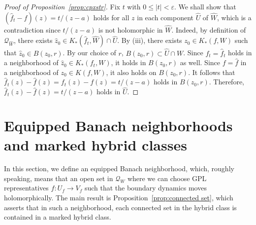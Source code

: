 \documentclass{amsart}
\numberwithin{equation}{section}
\theoremstyle{definition}
\theoremstyle{remark}
\begin{document}
\begin{proof} [Proof of Proposition~\ref{prop:cpxstr}]
Fix $t$ with $0\le |t|<\varepsilon.$ We shall show that $(\widehat{f}_t-\widehat{f})(z)=t/(z-a)$ holds for all $z$ in each component $\widehat{U}$ of $\widehat{W}$, which is a contradiction since $t/(z-a)$ is not holomorphic in $\widehat{W}$.  
Indeed, by definition of $\mathcal{Q}_{\widehat{W}}$, there exists $\widehat{z}_0\in K_*(\widehat{f}_t,\widehat{W})\cap \widehat{U}$. By (iii), there exists $z_0\in K_*(f,W)$ such that $\widehat{z}_0\in B(z_0,r)$. 
By our choice of $r$, $B(z_0,r)\subset \widehat{U}\cap W$. 
Since $f_t=\widehat{f}_t$ holds in a neighborhood of $\widehat{z}_0\in K_*(f_t,W)$, it holds in $B(z_0,r)$ as well. Since $f=\widehat{f}$ in a neighborhood of $z_0\in K(f,W)$, it also holds on $B(z_0,r)$. It follows that $\widehat{f}_t(z)-\widehat{f}(z)=f_t(z)-f(z)=t/(z-a)$ holds in $B(z_0,r)$. Therefore, 
$\widehat{f}_t(z)-\widehat{f}(z)=t/(z-a)$ holds in $\widehat{U}$.  
\end{proof}

\section{Equipped Banach neighborhoods and marked hybrid classes}\label{sec:markedclass}
In this section, we define an equipped Banach neighborhood, which, roughly speaking, means that an open set in $\mathcal{Q}_W$ where we can choose GPL representatives $f:U_f\to V_f$ such that the boundary dynamics moves holomorphically. The main result is Proposition~\ref{prop:connected set}, which asserts that in such a neighborhood, each connected set in the hybrid class is contained in a marked hybrid class. 
\end{document}
